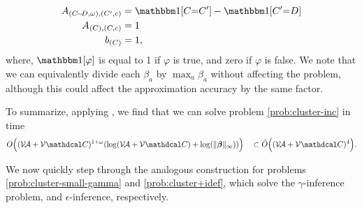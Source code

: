 \documentclass{article}
\begin{document}
\begin{lproof}
\begin{align*}
        A_{(C\!{-}\!D, \omega),(C',c)} &= \mathbbm1[C{=}C'] - \mathbbm1[C'{=}D]\\
        A_{(C),(C,c)} &= 1 \\
        b_{(C)} &= 1,
    \end{align*}
    where, $\mathbbm1[\varphi]$ is equal to 1 if $\varphi$ is true, and zero if $\varphi$ is false.
    We note that we can equivalently divide each $\beta_a$ by $\max_a \beta_a$ without affecting the problem, 
    although this could affect the approximation accuracy by the same factor. 
    
    To summarize, applying , we find that we can solve problem \eqref{prob:cluster-inc} in time
    \begin{align*}
        O\Big( (\V\!\Ar + \V\mathdcal C)^{1 + \omega} ( \log (\V\!\Ar + \V\mathdcal C) + \log( \Vert\bbeta\Vert_\infty)) \Big)
        \quad
        \subset \tilde O\Big( (\V\!\Ar + \V\mathdcal C)^4 \Big).
    \end{align*}
\end{lproof}

We now quickly step through the analogous construction for problems \eqref{prob:cluster-small-gamma} and \eqref{prob:cluster+idef}, which
solve the $\gamma$-inference problem, and $\epsilon$-inference, respectively.
\end{document}

